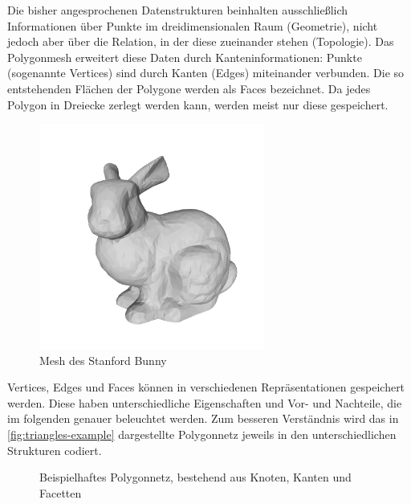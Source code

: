 Die bisher angesprochenen Datenstrukturen beinhalten ausschließlich Informationen über Punkte im dreidimensionalen Raum (Geometrie), nicht jedoch aber über die Relation, in der diese zueinander stehen (Topologie).
Das Polygonmesh erweitert diese Daten durch Kanteninformationen: Punkte (sogenannte Vertices) sind durch Kanten (Edges) miteinander verbunden.
Die so entstehenden Flächen der Polygone werden als Faces bezeichnet.
Da jedes Polygon in Dreiecke zerlegt werden kann, werden meist nur diese gespeichert.

\begin{figure}[ht]
	\centering
	\includegraphics[width=0.66\textwidth, frame]{images/bunny_mesh.png}
	\caption{Mesh des Stanford Bunny \cite{stanfordbunny}}
	\label{fig:bunny_mesh}
\end{figure}

Vertices, Edges und Faces können in verschiedenen Repräsentationen gespeichert werden.
Diese haben unterschiedliche Eigenschaften und Vor- und Nachteile, die im folgenden genauer beleuchtet werden.
Zum besseren Verständnis wird das in \autoref{fig:triangles-example} dargestellte Polygonnetz jeweils in den unterschiedlichen Strukturen codiert.

\begin{figure}[ht]
\centering
{}
\caption{Beispielhaftes Polygonnetz, bestehend aus Knoten, Kanten und Facetten}
\label{fig:triangles-example}
\end{figure}

